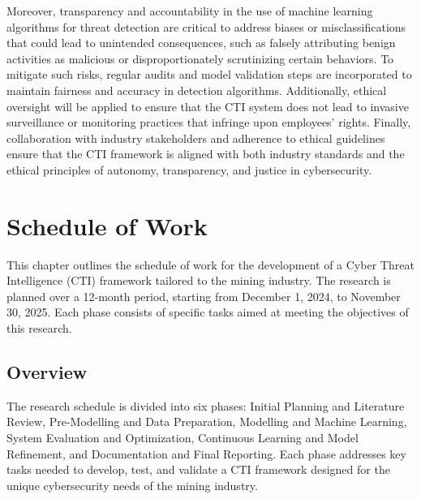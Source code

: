 \documentclass[a4paper,twoside,12pt]{report}
\begin{document}
Moreover, transparency and accountability in the use of machine learning algorithms for threat detection are critical to address biases or misclassifications that could lead to unintended consequences, such as falsely attributing benign activities as malicious or disproportionately scrutinizing certain behaviors. To mitigate such risks, regular audits and model validation steps are incorporated to maintain fairness and accuracy in detection algorithms. Additionally, ethical oversight will be applied to ensure that the CTI system does not lead to invasive surveillance or monitoring practices that infringe upon employees’ rights. Finally, collaboration with industry stakeholders and adherence to ethical guidelines ensure that the CTI framework is aligned with both industry standards and the ethical principles of autonomy, transparency, and justice in cybersecurity.

\chapter{Schedule of Work}

This chapter outlines the schedule of work for the development of a Cyber Threat Intelligence (CTI) framework tailored to the mining industry. The research is planned over a 12-month period, starting from December 1, 2024, to November 30, 2025. Each phase consists of specific tasks aimed at meeting the objectives of this research.

\section{Overview}

The research schedule is divided into six phases: Initial Planning and Literature Review, Pre-Modelling and Data Preparation, Modelling and Machine Learning, System Evaluation and Optimization, Continuous Learning and Model Refinement, and Documentation and Final Reporting. Each phase addresses key tasks needed to develop, test, and validate a CTI framework designed for the unique cybersecurity needs of the mining industry.
\end{document}
